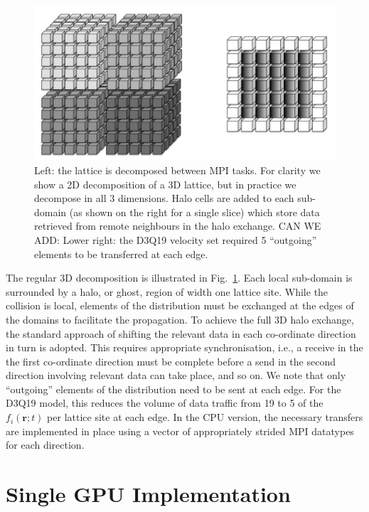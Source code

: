 \begin{figure}[!t]
\centering
\includegraphics[width=12cm]{Chapters/chapter14/figures/decomphalo}
\caption{Left: the lattice is decomposed between MPI tasks. For clarity
we show a 2D decomposition of a 3D lattice, but in practice we decompose
in all 3 dimensions. Halo cells are added to each sub-domain (as shown on
the right for a single slice) which store data retrieved from remote
neighbours in the halo exchange. CAN WE ADD: Lower right: the D3Q19
velocity set required 5 ``outgoing'' elements to be transferred at
each edge.}
\label{ch14:fig:decomphalo}
\end{figure}


The regular 3D decomposition is illustrated in Fig.~\ref{ch14:fig:decomphalo}.
Each local sub-domain is surrounded by a halo, or ghost, region of width one
lattice site. While the collision is local, elements of the distribution
must be exchanged at the edges of the domains to facilitate the propagation.
To achieve the full 3D halo exchange, the standard approach of shifting the
relevant data in each co-ordinate direction in turn is adopted. This
requires appropriate synchronisation, i.e., a receive in the the first
co-ordinate direction must be complete before a send in the second direction
involving relevant data can take place, and so on. We note that only
``outgoing'' elements of the distribution need to be sent at each edge.
For the D3Q19 model, this reduces the volume of data traffic from 19 to
5 of the $f_i(\mathbf{r};t)$ per lattice site at each edge. In the CPU
version, the necessary transfers are implemented in place using
a vector of appropriately strided MPI datatypes for each direction.


\section{Single GPU Implementation}\label{ch14:sec:singlegpu}


